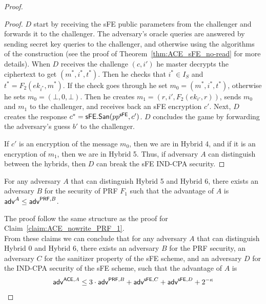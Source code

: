 \documentclass{llncs}
\begin{document}
\begin{proof}
\begin{proof}
$D$ start by receiving the sFE public parameters from the challenger and forwards it to the challenger. The adversary's oracle queries are answered by sending secret key queries to the challenger, and otherwise using the algorithms of the construction (see the proof of Theorem~\ref{thm:ACE_sFE_no-read} for more details).
When $D$ receives the challenge $(c,i')$ he master decrypts the ciphertext to get $(m^*,i^*,t^*)$. Then he checks that $i^* \in I_S$ and $t^* = F_{2}(ek_{i^*},m^*)$. If the check goes through he set $m_0 = (m^*,i^*,t^*)$, otherwise he sets $m_0 = (\bot,0,\bot)$.
Then he creates $m_1 = (r,i',F_{2}(ek_{i'},r))$, sends $m_0$ and $m_1$ to the challenger, and receives back an sFE encryption $c'$. 
Next, $D$ creates the response $c^* = \mathsf{sFE}.\mathsf{San}(pp^{\mathsf{sFE}},c')$.
$D$ concludes the game by forwarding the adversary's guess $b'$ to the challenger.


If $c'$ is an encryption of the message $m_0$, then we are in Hybrid 4, and if it is an encryption of $m_1$, then we are in Hybrid 5.
Thus, if adversary $A$ can distinguish between the hybrids, then $D$ can break the sFE IND-CPA security. 
\end{proof}

\begin{claim} \label{claim:ACE_nowrite_PRF_2}
For any adversary $A$ that can distinguish Hybrid 5 and Hybrid 6, there exists an adversary $B$ for the security of PRF $F_1$ such that the advantage of $A$ is 
$ \mathsf{adv}^{A} \leq \mathsf{adv}^{\mathsf{PRF},B}$. \\
\end{claim}

The proof follow the same structure as the proof for Claim~\ref{claim:ACE_nowrite_PRF_1}. \\

From these claims we can conclude that for any adversary $A$ that can distinguish Hybrid 0 and Hybrid 6, there exists an adversary $B$ for the PRF security, an adversary $C$ for the sanitizer property of the sFE scheme, and an adversary $D$ for the IND-CPA security of the sFE scheme, such that the advantage of $A$ is
\begin{align*}
	\mathsf{adv}^{\mathsf{ACE},A} \leq 3 \cdot \mathsf{adv}^{\mathsf{PRF}, B} + \mathsf{adv}^{\mathsf{sFE},C} + \mathsf{adv}^{\mathsf{sFE},D} + 2^{-\kappa}
\end{align*}
\end{proof}





\newpage


\appendix
\end{document}
